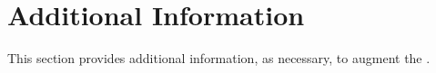 
\chapter{Additional Information}
\label{loc:AdditionalInformation}

This section provides additional information, as necessary, to augment the \STP.